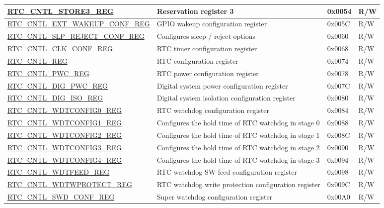 \begin{longtable}{ | l | L{6.5cm} | l | l | }
\hyperref[regdesc:RTCCNTLSTORE3REG]{RTC\_CNTL\_STORE3\_REG} & Reservation register 3 & 0x0054 & R/W \\ \hline
\hyperref[regdesc:RTCCNTLEXTWAKEUPCONFREG]{RTC\_CNTL\_EXT\_WAKEUP\_CONF\_REG} & GPIO wakeup configuration register & 0x005C & R/W \\ \hline
\hyperref[regdesc:RTCCNTLSLPREJECTCONFREG]{RTC\_CNTL\_SLP\_REJECT\_CONF\_REG} & Configures sleep / reject options & 0x0060 & R/W \\ \hline
\hyperref[regdesc:RTCCNTLCLKCONFREG]{RTC\_CNTL\_CLK\_CONF\_REG} & RTC timer configuration register & 0x0068 & R/W \\ \hline
\hyperref[regdesc:RTCCNTLREG]{RTC\_CNTL\_REG} & RTC configuration register & 0x0074 & R/W \\ \hline
\hyperref[regdesc:RTCCNTLPWCREG]{RTC\_CNTL\_PWC\_REG} & RTC power configuration register & 0x0078 & R/W \\ \hline
\hyperref[regdesc:RTCCNTLDIGPWCREG]{RTC\_CNTL\_DIG\_PWC\_REG} & Digital system power configuration register & 0x007C & R/W \\ \hline
\hyperref[regdesc:RTCCNTLDIGISOREG]{RTC\_CNTL\_DIG\_ISO\_REG} & Digital system isolation configuration register & 0x0080 & R/W \\ \hline
\hyperref[regdesc:RTCCNTLWDTCONFIG0REG]{RTC\_CNTL\_WDTCONFIG0\_REG} & RTC watchdog configuration register & 0x0084 & R/W \\ \hline
\hyperref[regdesc:RTCCNTLWDTCONFIG1REG]{RTC\_CNTL\_WDTCONFIG1\_REG} & Configures the hold time of RTC watchdog in stage 0 & 0x0088 & R/W \\ \hline
\hyperref[regdesc:RTCCNTLWDTCONFIG2REG]{RTC\_CNTL\_WDTCONFIG2\_REG} & Configures the hold time of RTC watchdog in stage 1 & 0x008C & R/W \\ \hline
\hyperref[regdesc:RTCCNTLWDTCONFIG3REG]{RTC\_CNTL\_WDTCONFIG3\_REG} & Configures the hold time of RTC watchdog in stage 2 & 0x0090 & R/W \\ \hline
\hyperref[regdesc:RTCCNTLWDTCONFIG4REG]{RTC\_CNTL\_WDTCONFIG4\_REG} & Configures the hold time of RTC watchdog in stage 3 & 0x0094 & R/W \\ \hline
\hyperref[regdesc:RTCCNTLWDTFEEDREG]{RTC\_CNTL\_WDTFEED\_REG} & RTC watchdog SW feed configuration register & 0x0098 & R/W \\ \hline
\hyperref[regdesc:RTCCNTLWDTWPROTECTREG]{RTC\_CNTL\_WDTWPROTECT\_REG} & RTC watchdog write protection configuration register & 0x009C & R/W \\ \hline
\hyperref[regdesc:RTCCNTLSWDCONFREG]{RTC\_CNTL\_SWD\_CONF\_REG} & Super watchdog configuration register & 0x00A0 & R/W \\ \hline

\end{longtable}

